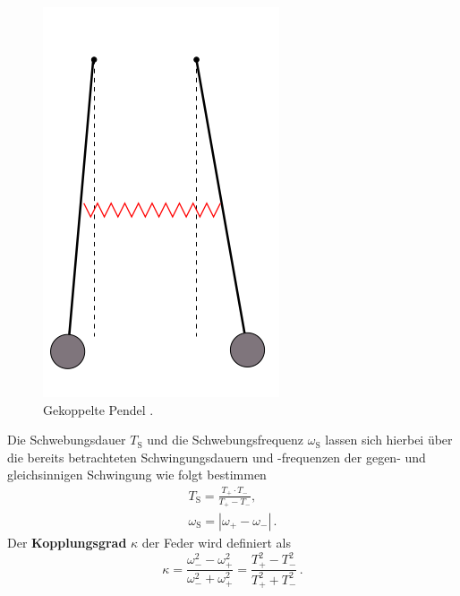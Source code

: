\begin{figure}
	\centering
	\includegraphics[width=0.4\linewidth]{Bilder/gekoppelt.png}
	\caption{Gekoppelte Pendel \cite{Anleitung}.}
	\label{fig:schwebe}

\end{figure}
\FloatBarrier
Die Schwebungsdauer $T_{\mathrm{S}}$ und die Schwebungsfrequenz $\omega_{\mathrm{S}}$ lassen sich hierbei über die bereits betrachteten Schwingungsdauern und -frequenzen der gegen- und gleichsinnigen Schwingung wie folgt bestimmen
\begin{gather}
	\label{eqn:twschwebe}
	T_{\mathrm{S}}=\frac{T_{\mathrm{+}}\cdot T_{\mathrm{-}}}{T_{\mathrm{+}}-T_{\mathrm{-}}} \text{,}\\
	\label{eqn:twtest}
	\omega_{\mathrm{S}}=|\omega_{\mathrm{+}}-\omega_{\mathrm{-}}| \, \text{.}
\end{gather}
Der \textbf{Kopplungsgrad} $\kappa$ der Feder wird definiert als
\begin{equation}
	\label{eqn:kappa}
	\kappa=\frac{\omega_{\mathrm{-}}^2-\omega_{\mathrm{+}}^2}{\omega_{\mathrm{-}}^2+\omega_{\mathrm{+}}^2}=\frac{T_{\mathrm{+}}^2-T_{\mathrm{-}}^2}{T_{\mathrm{+}}^2+T_{\mathrm{-}}^2} \, \text{.}
\end{equation}
